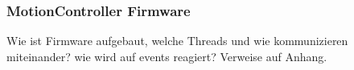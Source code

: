 \documentclass[main.tex]{subfiles} %
\begin{document}

\subsubsection{MotionController Firmware}

Wie ist Firmware aufgebaut, welche Threads und wie kommunizieren miteinander?
wie wird auf events reagiert? Verweise auf Anhang.
\end{document}
